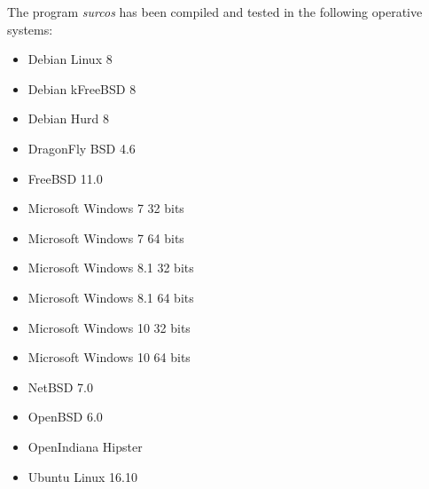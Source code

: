 The program \emph{surcos} has been compiled and tested in the following
operative systems:
\begin{itemize}
\item Debian Linux 8
\item Debian kFreeBSD 8
\item Debian Hurd 8
\item DragonFly BSD 4.6
\item FreeBSD 11.0
\item Microsoft Windows 7 32 bits
\item Microsoft Windows 7 64 bits
\item Microsoft Windows 8.1 32 bits
\item Microsoft Windows 8.1 64 bits
\item Microsoft Windows 10 32 bits
\item Microsoft Windows 10 64 bits
\item NetBSD 7.0
\item OpenBSD 6.0
\item OpenIndiana Hipster
\item Ubuntu Linux 16.10
\end{itemize}
